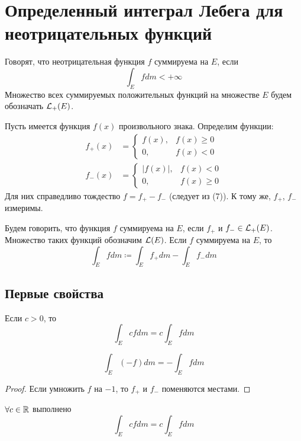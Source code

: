 \documentclass[main]{subfiles}
\begin{document}
\section{Определенный интеграл Лебега для неотрицательных функций}
\begin{definition}
    Говорят, что неотрицательная функция $f$ суммируема на $E$, если
    \[\int_E f dm < +\infty \tag{6}\]
    Множество всех суммируемых положительных функций на множестве $E$ будем обозначать $\mathcal{L}_+(E)$.
\end{definition}

Пусть имеется функция $f(x)$ произвольного знака.
Определим функции:
\begin{align*}
    f_+(x) & = \begin{cases}
                   f(x), & f(x) \ge 0 \\
                   0,    & f(x) < 0
               \end{cases}   \\
    f_-(x) & = \begin{cases}
                   |f(x)|, & f(x) < 0   \\
                   0,      & f(x) \ge 0
               \end{cases} \tag{7}
\end{align*}
Для них справедливо тождество $f = f_+ - f_-$ (следует из (7)).
К тому же, $f_+$, $f_-$ измеримы.
\begin{definition}
    Будем говорить, что функция $f$ суммируема на $E$, если $f_+$ и $f_- \in \mathcal{L}_+(E)$.
    Множество таких функций обозначим $\mathcal{L}(E)$.
    Если $f$ суммируема на $E$, то
    \[\int_E f dm \coloneq \int_E f_+ dm - \int_E f_- dm \tag{8}\]
\end{definition}
\subsection{Первые свойства}
\begin{property}
    Если $c > 0$, то
    \[\int_E cf dm = c \int_E f dm \tag{9}\]
\end{property}

\begin{property}
    \[\int_E (-f) dm = - \int_E f dm \tag{9'}\]
\end{property}
\begin{proof}
    Если умножить $f$ на $-1$, то $f_+$ и $f_-$ поменяются местами.
\end{proof}

\begin{property}
    $\forall c \in \mathbb{R}$ выполнено
    \[\int_E cf dm = c \int_E f dm \tag{9''}\]
\end{property}
\end{document}
